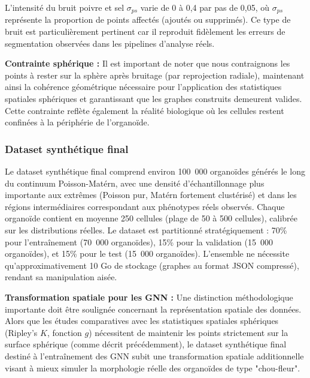 L'intensité du bruit poivre et sel $\sigma_{ps}$ varie de 0 à 0,4 par pas de 0,05, où $\sigma_{ps}$ représente la proportion de points affectés (ajoutés ou supprimés). Ce type de bruit est particulièrement pertinent car il reproduit fidèlement les erreurs de segmentation observées dans les pipelines d'analyse réels.

\textbf{Contrainte sphérique :}
Il est important de noter que nous contraignons les points à rester sur la sphère après bruitage (par reprojection radiale), maintenant ainsi la cohérence géométrique nécessaire pour l'application des statistiques spatiales sphériques et garantissant que les graphes construits demeurent valides. Cette contrainte reflète également la réalité biologique où les cellules restent confinées à la périphérie de l'organoïde.

\subsubsection{Dataset synthétique final}
\label{sec:dataset_final}

Le dataset synthétique final comprend environ 100~000 organoïdes générés le long du continuum Poisson-Matérn, avec une densité d'échantillonnage plus importante aux extrêmes (Poisson pur, Matérn fortement clustérisé) et dans les régions intermédiaires correspondant aux phénotypes réels observés. Chaque organoïde contient en moyenne 250 cellules (plage de 50 à 500 cellules), calibrée sur les distributions réelles. Le dataset est partitionné stratégiquement : 70\% pour l'entraînement (70~000 organoïdes), 15\% pour la validation (15~000 organoïdes), et 15\% pour le test (15~000 organoïdes). L'ensemble ne nécessite qu'approximativement 10 Go de stockage (graphes au format JSON compressé), rendant sa manipulation aisée.

\textbf{Transformation spatiale pour les GNN :}
Une distinction méthodologique importante doit être soulignée concernant la représentation spatiale des données. Alors que les études comparatives avec les statistiques spatiales sphériques (Ripley's $K$, fonction $g$) nécessitent de maintenir les points strictement sur la surface sphérique (comme décrit précédemment), le dataset synthétique final destiné à l'entraînement des GNN subit une transformation spatiale additionnelle visant à mieux simuler la morphologie réelle des organoïdes de type "chou-fleur".

